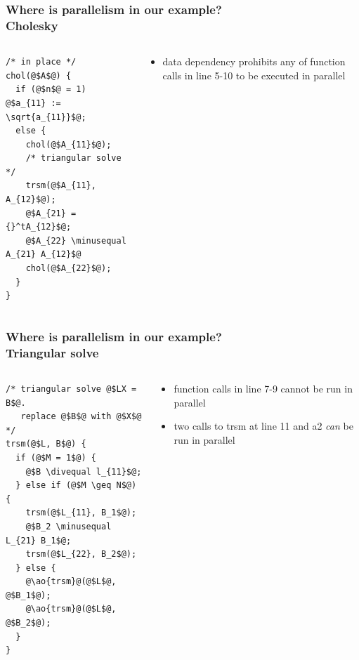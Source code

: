 \documentclass[12pt,dvipdfmx]{beamer}
\newcommand{\minusequal}{\mbox{\tt\ -= }}
\newcommand{\divequal}{\mbox{\tt\ /= }}
\newcommand{\ao}[1]{{\color{blue}#1}}
\begin{document}
\begin{frame}[fragile]
\frametitle{Where is parallelism in our example? \\ Cholesky}

\begin{columns}[t]
\begin{column}{0.4\textwidth}
\begin{lstlisting}[basicstyle=\scriptsize]
/* in place */
chol(@$A$@) {
  if (@$n$@ = 1) @$a_{11} := \sqrt{a_{11}}$@;
  else {
    chol(@$A_{11}$@);
    /* triangular solve */
    trsm(@$A_{11}, A_{12}$@);
    @$A_{21} = {}^tA_{12}$@;
    @$A_{22} \minusequal A_{21} A_{12}$@
    chol(@$A_{22}$@);
  }
}
\end{lstlisting}
\end{column}

\begin{column}{0.5\textwidth}
  \begin{itemize}
  \item data dependency prohibits any of function calls
    in line 5-10 to be executed in parallel
  \end{itemize}
\end{column}
\end{columns}
\end{frame}



\begin{frame}[fragile]
\frametitle{Where is parallelism in our example? \\ Triangular solve}

\begin{columns}[t]
\begin{column}{0.4\textwidth}
\begin{lstlisting}[basicstyle=\scriptsize]
/* triangular solve @$LX = B$@. 
   replace @$B$@ with @$X$@ */
trsm(@$L, B$@) {
  if (@$M = 1$@) {
    @$B \divequal l_{11}$@;
  } else if (@$M \geq N$@) {
    trsm(@$L_{11}, B_1$@);
    @$B_2 \minusequal L_{21} B_1$@;
    trsm(@$L_{22}, B_2$@);
  } else {
    @\ao{trsm}@(@$L$@, @$B_1$@);
    @\ao{trsm}@(@$L$@, @$B_2$@);
  }
}
\end{lstlisting}
\end{column}

\begin{column}{0.5\textwidth}
  \begin{itemize}
  \item function calls in line 7-9 cannot be run in parallel
  \item two calls to trsm at line 11 and a2 
    \ao{\em can} be run in parallel
  \end{itemize}
\end{column}
\end{columns}
\end{frame}
\end{document}
